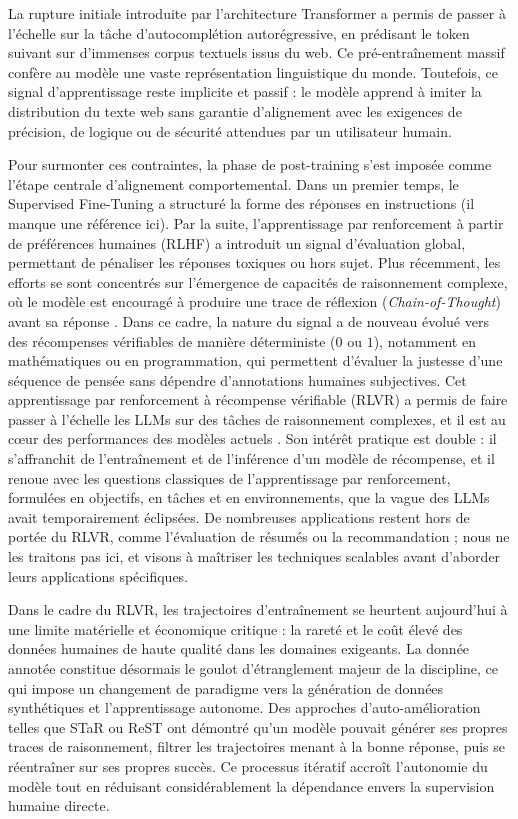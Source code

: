 \documentclass[11pt,a4paper]{article}
\begin{document}
La rupture initiale introduite par l'architecture Transformer \cite{vaswani2017attention} a permis de passer à l'échelle sur la tâche d'autocomplétion autorégressive, en prédisant le token suivant sur d'immenses corpus textuels issus du web. Ce pré-entraînement massif confère au modèle une vaste représentation linguistique du monde. Toutefois, ce signal d'apprentissage reste implicite et passif : le modèle apprend à imiter la distribution du texte web sans garantie d'alignement avec les exigences de précision, de logique ou de sécurité attendues par un utilisateur humain.

Pour surmonter ces contraintes, la phase de post-training s'est imposée comme l'étape centrale d'alignement comportemental. Dans un premier temps, le Supervised Fine-Tuning a structuré la forme des réponses en instructions (il manque une référence ici). Par la suite, l'apprentissage par renforcement à partir de préférences humaines (RLHF) \cite{ouyang2022training} a introduit un signal d'évaluation global, permettant de pénaliser les réponses toxiques ou hors sujet. Plus récemment, les efforts se sont concentrés sur l'émergence de capacités de raisonnement complexe, où le modèle est encouragé à produire une trace de réflexion (\emph{Chain-of-Thought}) avant sa réponse \cite{wei2022cot}. Dans ce cadre, la nature du signal a de nouveau évolué vers des récompenses vérifiables de manière déterministe ($0$ ou $1$), notamment en mathématiques ou en programmation, qui permettent d'évaluer la justesse d'une séquence de pensée sans dépendre d'annotations humaines subjectives. Cet apprentissage par renforcement à récompense vérifiable (RLVR) a permis de faire passer à l'échelle les LLMs sur des tâches de raisonnement complexes, et il est au cœur des performances des modèles actuels \cite{openai_o1_2024, deepseekr1_2025}. Son intérêt pratique est double : il s'affranchit de l'entraînement et de l'inférence d'un modèle de récompense, et il renoue avec les questions classiques de l'apprentissage par renforcement, formulées en objectifs, en tâches et en environnements, que la vague des LLMs avait temporairement éclipsées. De nombreuses applications restent hors de portée du RLVR, comme l'évaluation de résumés ou la recommandation ; nous ne les traitons pas ici, et visons à maîtriser les techniques scalables avant d'aborder leurs applications spécifiques.

Dans le cadre du RLVR, les trajectoires d'entraînement se heurtent aujourd'hui à une limite matérielle et économique critique : la rareté et le coût élevé des données humaines de haute qualité dans les domaines exigeants. La donnée annotée constitue désormais le goulot d'étranglement majeur de la discipline, ce qui impose un changement de paradigme vers la génération de données synthétiques et l'apprentissage autonome. Des approches d'auto-amélioration telles que STaR \cite{zelikman2022star} ou ReST \cite{singh2024beyond} ont démontré qu'un modèle pouvait générer ses propres traces de raisonnement, filtrer les trajectoires menant à la bonne réponse, puis se réentraîner sur ses propres succès. Ce processus itératif accroît l'autonomie du modèle tout en réduisant considérablement la dépendance envers la supervision humaine directe.
\end{document}
